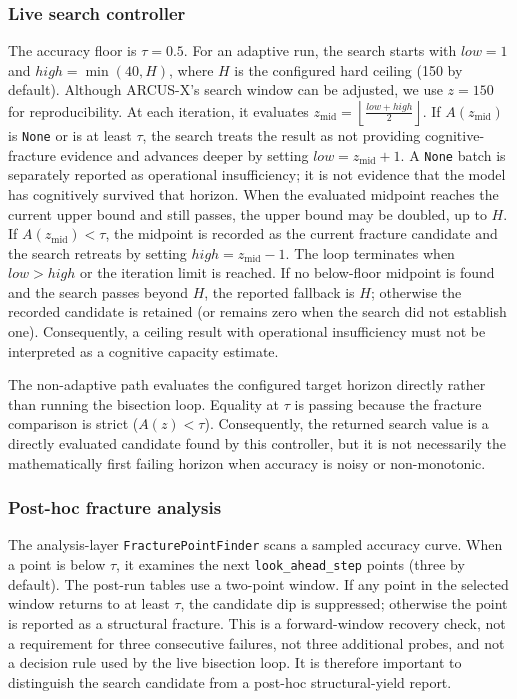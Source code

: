 \documentclass{article}
\begin{document}
\subsubsection{Live search controller}
The accuracy floor is $\tau=0.5$. For an adaptive run, the search starts with $low=1$ and $high=\min(40,H)$, where $H$ is the configured hard ceiling (150 by default). Although ARCUS-X's search window can be adjusted, we use $z=150$ for reproducibility. At each iteration, it evaluates
$z_{\mathrm{mid}}=\left\lfloor\frac{low+high}{2}\right\rfloor$.
If $A(z_{\mathrm{mid}})$ is \texttt{None} or is at least $\tau$, the search treats the result as not providing cognitive-fracture evidence and advances deeper by setting $low=z_{\mathrm{mid}}+1$. A \texttt{None} batch is separately reported as operational insufficiency; it is not evidence that the model has cognitively survived that horizon. When the evaluated midpoint reaches the current upper bound and still passes, the upper bound may be doubled, up to $H$. If $A(z_{\mathrm{mid}})<\tau$, the midpoint is recorded as the current fracture candidate and the search retreats by setting $high=z_{\mathrm{mid}}-1$. The loop terminates when $low>high$ or the iteration limit is reached. If no below-floor midpoint is found and the search passes beyond $H$, the reported fallback is $H$; otherwise the recorded candidate is retained (or remains zero when the search did not establish one). Consequently, a ceiling result with operational insufficiency must not be interpreted as a cognitive capacity estimate.

The non-adaptive path evaluates the configured target horizon directly rather than running the bisection loop. Equality at $\tau$ is passing because the fracture comparison is strict ($A(z)<\tau$). Consequently, the returned search value is a directly evaluated candidate found by this controller, but it is not necessarily the mathematically first failing horizon when accuracy is noisy or non-monotonic.

\subsubsection{Post-hoc fracture analysis}
The analysis-layer \texttt{FracturePointFinder} scans a sampled accuracy curve. When a point is below $\tau$, it examines the next \texttt{look\_ahead\_step} points (three by default). The post-run tables use a two-point window. If any point in the selected window returns to at least $\tau$, the candidate dip is suppressed; otherwise the point is reported as a structural fracture. This is a forward-window recovery check, not a requirement for three consecutive failures, not three additional probes, and not a decision rule used by the live bisection loop. It is therefore important to distinguish the search candidate from a post-hoc structural-yield report.
\end{document}
